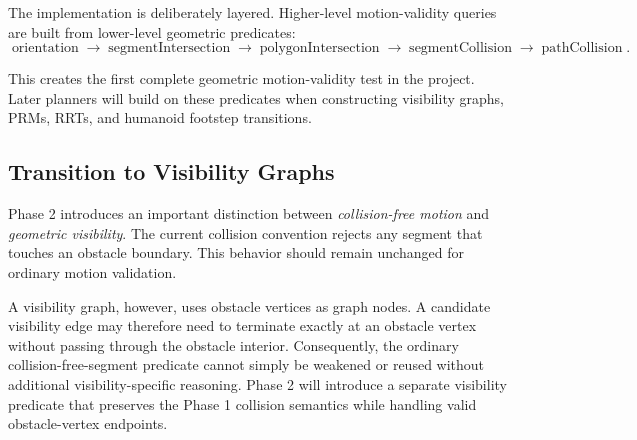 The implementation is deliberately layered. Higher-level motion-validity
queries are built from lower-level geometric predicates:
\[
\operatorname{orientation}
\longrightarrow
\operatorname{segmentIntersection}
\longrightarrow
\operatorname{polygonIntersection}
\longrightarrow
\operatorname{segmentCollision}
\longrightarrow
\operatorname{pathCollision}.
\]

This creates the first complete geometric motion-validity test in the
project. Later planners will build on these predicates when constructing
visibility graphs, PRMs, RRTs, and humanoid footstep transitions.

\subsection{Transition to Visibility Graphs}

Phase 2 introduces an important distinction between \emph{collision-free
motion} and \emph{geometric visibility}. The current collision convention
rejects any segment that touches an obstacle boundary. This behavior should
remain unchanged for ordinary motion validation.

A visibility graph, however, uses obstacle vertices as graph nodes. A candidate
visibility edge may therefore need to terminate exactly at an obstacle vertex
without passing through the obstacle interior. Consequently, the ordinary
collision-free-segment predicate cannot simply be weakened or reused without
additional visibility-specific reasoning. Phase 2 will introduce a separate
visibility predicate that preserves the Phase 1 collision semantics while
handling valid obstacle-vertex endpoints.
